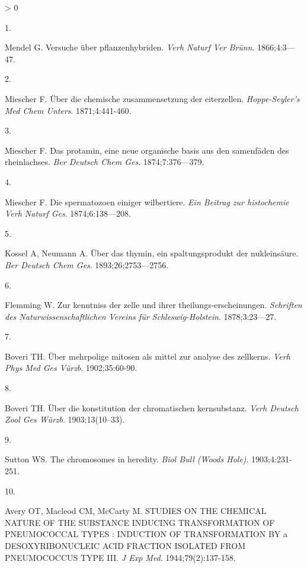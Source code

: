 \documentclass[11pt,letterpaper,oneside]{book}
\newlength{\cslhangindent}
\newlength{\csllabelwidth}
\newenvironment{CSLReferences}[3] %
 {%
  \setlength{\parindent}{0pt}
  \ifodd #1 \everypar{\setlength{\hangindent}{\cslhangindent}}\ignorespaces\fi
  \ifnum #2 > 0
  \setlength{\parskip}{#2\baselineskip}
  \fi
 }%
 {}
\newcommand{\CSLLeftMargin}[1]{\parbox[t]{\maxof{\widthof{#1}}{\csllabelwidth}}{#1}}
\newcommand{\CSLRightInline}[1]{\parbox[t]{\linewidth-\csllabelwidth}{#1}\newline}
\begin{document}
\hypertarget{refs}{}
\begin{CSLReferences}{0}{0}
\leavevmode\hypertarget{ref-mendel:1866aa}{}%
\CSLLeftMargin{1. }
\CSLRightInline{Mendel G. Versuche {ü}ber pflanzenhybriden. \emph{Verh Naturf Ver Br{ü}nn}. 1866;4:3---47.}

\leavevmode\hypertarget{ref-miescher:1871aa}{}%
\CSLLeftMargin{2. }
\CSLRightInline{Miescher F. {Ü}ber die chemische zusammensetzung der eiterzellen. \emph{Hoppe-Seyler's Med Chem Unters}. 1871;4:441-460.}

\leavevmode\hypertarget{ref-miescher:1874aa}{}%
\CSLLeftMargin{3. }
\CSLRightInline{Miescher F. Das protamin, eine neue organische basis aus den samenf{ä}den des rheinlachses. \emph{Ber Deutsch Chem Ges}. 1874;7:376---379.}

\leavevmode\hypertarget{ref-miescher:1874ab}{}%
\CSLLeftMargin{4. }
\CSLRightInline{Miescher F. Die spermatozoen einiger wilbertiere. \emph{Ein Beitrag zur histochemie Verh Naturf Ges}. 1874;6:138---208.}

\leavevmode\hypertarget{ref-kossel:1893aa}{}%
\CSLLeftMargin{5. }
\CSLRightInline{Kossel A, Neumann A. {Ü}ber das thymin, ein spaltungsprodukt der nukleins{ä}ure. \emph{Ber Deutsch Chem Ges}. 1893;26:2753---2756.}

\leavevmode\hypertarget{ref-flemming:1878aa}{}%
\CSLLeftMargin{6. }
\CSLRightInline{Flemming W. Zur kenntniss der zelle und ihrer theilungs-erscheinungen. \emph{Schriften des Naturwissenschaftlichen Vereins f{ü}r Schleswig-Holstein}. 1878;3:23---27.}

\leavevmode\hypertarget{ref-boveri:1902aa}{}%
\CSLLeftMargin{7. }
\CSLRightInline{Boveri TH. {Ü}ber mehrpolige mitosen als mittel zur analyse des zellkerns. \emph{Verh Phys Med Ges V{ü}rzb}. 1902;35:60-90.}

\leavevmode\hypertarget{ref-boveri:1903aa}{}%
\CSLLeftMargin{8. }
\CSLRightInline{Boveri TH. {Ü}ber die konstitution der chromatischen kernsubstanz. \emph{Verh Deutsch Zool Ges W{ü}rzb}. 1903;13(10--33).}

\leavevmode\hypertarget{ref-sutton:1903aa}{}%
\CSLLeftMargin{9. }
\CSLRightInline{Sutton WS. The chromosomes in heredity. \emph{Biol Bull (Woods Hole)}. 1903;4:231-251.}

\leavevmode\hypertarget{ref-avery:1944aa}{}%
\CSLLeftMargin{10. }
\CSLRightInline{Avery OT, Macleod CM, McCarty M. STUDIES ON THE CHEMICAL NATURE OF THE SUBSTANCE INDUCING TRANSFORMATION OF PNEUMOCOCCAL TYPES : INDUCTION OF TRANSFORMATION BY a DESOXYRIBONUCLEIC ACID FRACTION ISOLATED FROM PNEUMOCOCCUS TYPE III. \emph{J Exp Med}. 1944;79(2):137-158.}


\end{CSLReferences}
\end{document}
